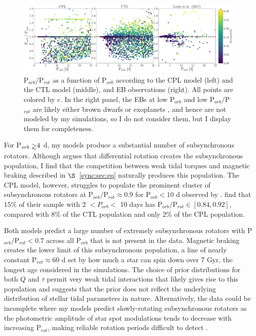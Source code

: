 \begin{figure}
	\includegraphics[width=\columnwidth]{lurieFig7.pdf}
   \caption{P$_{orb}/$P$_{rot}$ as a function of P$_{orb}$ according to the CPL model (left) and the CTL model (middle), and \citet{Lurie2017} \kepler EB observations (right). All points are colored by $e$.  In the right panel, the \kepler EBs at low P$_{orb}$ and low P$_{orb}/$P$_{rot}$ are likely either brown dwarfs or exoplanets \citep{Lurie2017}, and hence are not modeled by my simulations, so I do not consider them, but I display them for completeness.}%
    \label{sync:fig:lurie7}%
\end{figure}

For P$_{orb} \gsim 4$ d, my models produce a substantial number of subsynchronous rotators. Although \citet{Lurie2017} argues that differential rotation creates the subsynchronous population, I find that the competition between weak tidal torques and magnetic braking described in $\S$~\ref{sync:sec:eq} naturally produces this population. The CPL model, however, struggles to populate the prominent cluster of subsynchronous rotators at P$_{orb}/$P$_{rot} \approx 0.9$ for P$_{orb} < 10$ d observed by \citet{Lurie2017}.  \citet{Lurie2017} find that $15\%$ of their sample with 2 $< P_{orb} <$ 10 days has P$_{orb}/$P$_{rot} \in [0.84, 0.92]$, compared with $8\%$ of the CTL population and only $2\%$ of the CPL population.

Both models predict a large number of extremely subsynchronous rotators with P$_{orb}/$P$_{rot} < 0.7$ across all P$_{orb}$ that is not present in the \citet{Lurie2017} data. Magnetic braking creates the lower limit of this subsynchronous population, a line of nearly constant P$_{rot} \approx 60$ d set by how much a star can spin down over 7 Gyr, the longest age considered in the simulations. The choice of prior distributions for both $Q$ and $\tau$ permit very weak tidal interactions that likely gives rise to this population and suggests that the prior does not reflect the underlying distribution of stellar tidal parameters in nature. Alternatively, the data could be incomplete where my models predict slowly-rotating subsynchronous rotators as the photometric amplitude of star spot modulations tends to decrease with increasing P$_{rot}$, making reliable rotation periods difficult to detect \citep{McQuillan2014,Lurie2017,Reinhold2018}. 


